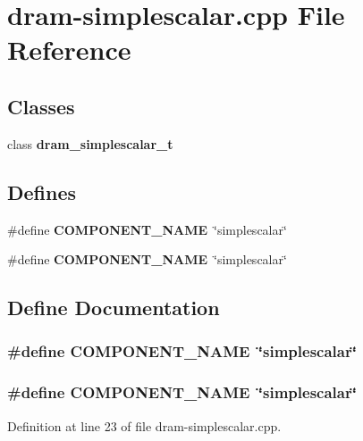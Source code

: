 \section{dram-simplescalar.cpp File Reference}
\label{dram-simplescalar_8cpp}
\subsection*{Classes}
\begin{CompactItemize}
\item 
class {\bf dram\_\-simplescalar\_\-t}
\end{CompactItemize}
\subsection*{Defines}
\begin{CompactItemize}
\item 
\#define {\bf COMPONENT\_\-NAME}~\char`\"{}simplescalar\char`\"{}
\item 
\#define {\bf COMPONENT\_\-NAME}~\char`\"{}simplescalar\char`\"{}
\end{CompactItemize}


\subsection{Define Documentation}
\subsubsection[{COMPONENT\_\-NAME}]{\setlength{\rightskip}{0pt plus 5cm}\#define COMPONENT\_\-NAME~\char`\"{}simplescalar\char`\"{}}\label{zesto-dram_8cpp_9146ade7ce24e3db226a973a59063892}


\subsubsection[{COMPONENT\_\-NAME}]{\setlength{\rightskip}{0pt plus 5cm}\#define COMPONENT\_\-NAME~\char`\"{}simplescalar\char`\"{}}\label{dram-simplescalar_8cpp_9146ade7ce24e3db226a973a59063892}




Definition at line 23 of file dram-simplescalar.cpp.